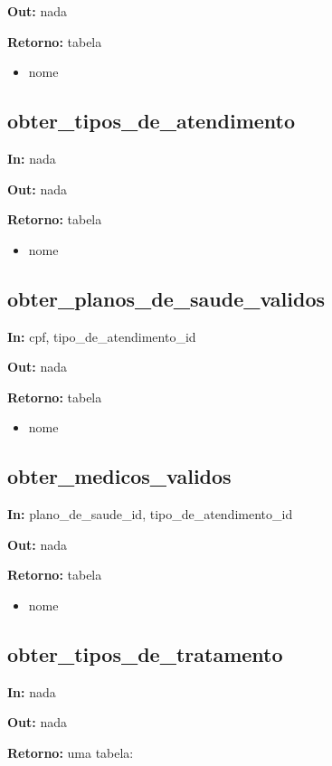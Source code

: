 \textbf{Out:} nada

\textbf{Retorno:} tabela

\begin{itemize}
	\item nome
\end{itemize}

\subsection{obter\_tipos\_de\_atendimento}
\textbf{In:} nada

\textbf{Out:} nada

\textbf{Retorno:} tabela

\begin{itemize}
	\item nome
\end{itemize}

\subsection{obter\_planos\_de\_saude\_validos}
\textbf{In:} cpf, tipo\_de\_atendimento\_id

\textbf{Out:} nada

\textbf{Retorno:} tabela

\begin{itemize}
	\item nome
\end{itemize}

\subsection{obter\_medicos\_validos}
\textbf{In:} plano\_de\_saude\_id, tipo\_de\_atendimento\_id

\textbf{Out:} nada

\textbf{Retorno:} tabela

\begin{itemize}
	\item nome
\end{itemize}

\subsection{obter\_tipos\_de\_tratamento}

\textbf{In:} nada

\textbf{Out:} nada

\textbf{Retorno:} uma tabela:

